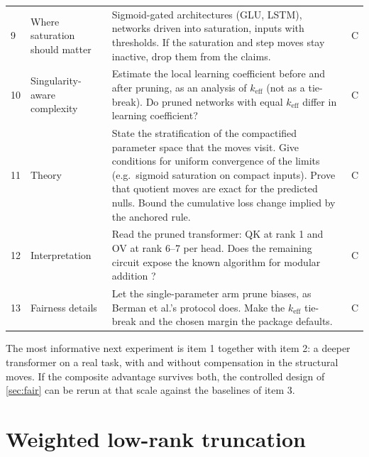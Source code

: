 \documentclass[11pt,a4paper]{article}
\theoremstyle{definition}
\newcommand{\keff}{k_{\mathrm{eff}}}
\begin{document}
\begin{table}[htbp]
\begin{tabularx}{\textwidth}{@{}p{0.4cm}p{3.6cm}Xp{1.0cm}@{}}
9 & Where saturation should matter & Sigmoid-gated architectures (GLU, LSTM), networks driven into saturation, inputs with thresholds. If the saturation and step moves stay inactive, drop them from the claims. & C\\
10 & Singularity-aware complexity & Estimate the local learning coefficient \citep{lau2025llc} before and after pruning, as an analysis of $\keff$ (not as a tie-break). Do pruned networks with equal $\keff$ differ in learning coefficient? & C\\
11 & Theory & State the stratification of the compactified parameter space that the moves visit. Give conditions for uniform convergence of the limits (e.g.\ sigmoid saturation on compact inputs). Prove that quotient moves are exact for the predicted nulls. Bound the cumulative loss change implied by the anchored rule. & C\\
12 & Interpretation & Read the pruned transformer: QK at rank 1 and OV at rank 6--7 per head. Does the remaining circuit expose the known algorithm for modular addition \citep{nanda2023progress}? & C\\
13 & Fairness details & Let the single-parameter arm prune biases, as Berman et al.'s protocol does. Make the $\keff$ tie-break and the chosen margin the package defaults. & C\\
\bottomrule
\end{tabularx}
\end{table}

The most informative next experiment is item 1 together with item 2: a deeper
transformer on a real task, with and without compensation in the structural moves.
If the composite advantage survives both, the controlled design of \cref{sec:fair} can
be rerun at that scale against the baselines of item 3.

\FloatBarrier

\appendix

\section{Weighted low-rank truncation}
\label{app:wsvd}
\end{document}
